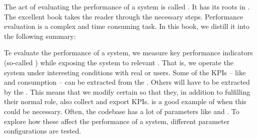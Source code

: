 The act of evaluating the performance of a system is called . It has its roots in \cite{Denning:1980:APL:359015.359016}. The excellent  book takes the reader through the necessary steps\cite{jain1991art}. Performance evaluation is a complex and time consuming task. In this book, we distill it into the following summary:

Te evaluate the performance of a system, we measure key performance indicators (so-called ) while exposing the system to relevant . That is, we operate the system under interesting conditions with real or  users. Some of the KPIs -- like  and  consumption -- can be extracted from the . Others will have to be extracted by  the . This means that we modify certain  so that they, in addition to fulfilling their normal role, also collect and export KPIs.  is a good example of when this could be necessary. Often, the codebase has a lot of  parameters like  and . To explore how these affect the performance of a system, different parameter configurations are tested.


